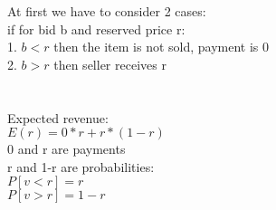 \documentclass{article}
\begin{document}























At first we have to consider 2 cases:\\
if for bid b and reserved price r:\\
1. $b<r$ then the item is not sold, payment is 0\\
2. $b>r$ then seller receives r\\
\\\\
Expected revenue:\\
$E(r) = 0 * r + r * (1-r)$\\
0 and r are payments\\
r and 1-r are probabilities:\\
$P[v<r] = r$\\
$P[v>r] = 1-r$\\
\end{document}
